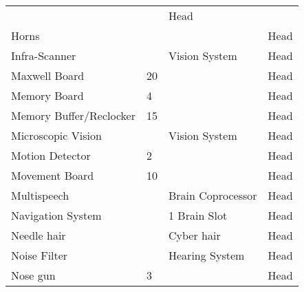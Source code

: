 \documentclass[twoside]{book}
\begin{document}
\begin{longtable}{p{1.25in}p{2em}ll}
  &
  
  &
   Head 
  \tabularnewline
      
  \raggedright
           Horns 
  &
  
  &
  
  &
   Head 
  \tabularnewline
      
  \raggedright
           Infra-Scanner 
  &
  
  &
   Vision System 
  &
   Head 
  \tabularnewline
      
  \raggedright
           Maxwell Board 
  &
   20 
  &
  
  &
   Head 
  \tabularnewline
      
  \raggedright
           Memory Board 
  &
   4 
  &
  
  &
   Head 
  \tabularnewline
      
  \raggedright
           Memory Buffer/Reclocker
           
  &
   15 
  &
  
  &
   Head 
  \tabularnewline
      
  \raggedright
           Microscopic Vision 
  &
  
  &
   Vision System 
  &
   Head 
  \tabularnewline
      
  \raggedright
           Motion Detector 
  &
   2 
  &
  
  &
   Head 
  \tabularnewline
      
  \raggedright
           Movement Board 
  &
   10 
  &
  
  &
   Head 
  \tabularnewline
      
  \raggedright
           Multispeech 
  &
  
  &
   Brain Coprocessor
           
  &
   Head 
  \tabularnewline
      
  \raggedright
           Navigation System 
  &
  
  &
   1 Brain Slot 
  &
   Head 
  \tabularnewline
      
  \raggedright
           Needle hair 
  &
  
  &
   Cyber hair 
  &
   Head 
  \tabularnewline
      
  \raggedright
           Noise Filter 
  &
  
  &
   Hearing System 
  &
   Head 
  \tabularnewline
      
  \raggedright
           Nose gun 
  &
   3 
  &
  
  &
   Head 
  \tabularnewline
      

\end{longtable}
\end{document}
